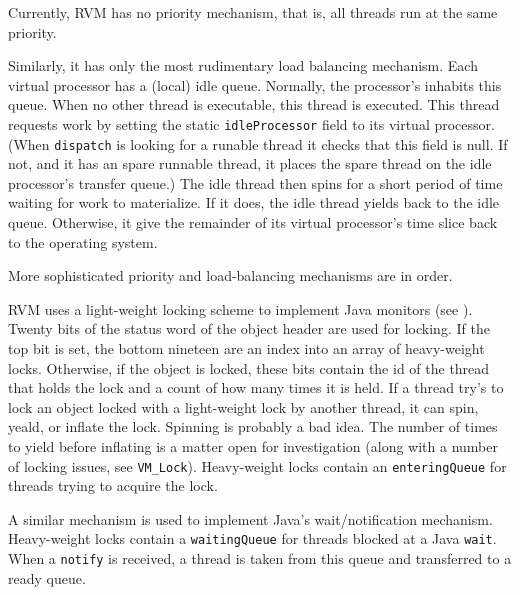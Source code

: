 Currently, RVM has no priority mechanism, that is, all threads run
at the same priority.

Similarly, it has only the most rudimentary load balancing mechanism.
Each virtual processor has a (local) idle queue.  Normally, the
processor's 
inhabits this queue.  When no other
thread is executable, this thread is executed.  This thread requests
work by setting the static {\tt idleProcessor} field to its virtual
processor.  (When {\tt dispatch} is looking for a runable thread it
checks that this field is null.  If not, and it has an spare runnable
thread, it places the spare thread on the idle processor's transfer
queue.)  The idle thread then spins for a short period of time waiting
for work to materialize.  If it does, the idle thread yields back to
the idle queue.  Otherwise, it give the remainder of its virtual
processor's time slice back to the operating system.

More sophisticated priority and load-balancing mechanisms are in
order.

RVM uses a light-weight locking scheme to implement Java monitors (see
).  Twenty bits of the status word of the object header are
used for locking.  If the top bit is set, the bottom nineteen are an
index into an array of heavy-weight locks.  Otherwise, if the object
is locked, these bits contain the id of the thread that holds the lock
and a count of how many times it is held.  If a thread try's to lock
an object locked with a light-weight lock by another thread, it can
spin, yeald, or inflate the lock.  Spinning is probably a bad idea.
The number of times to yield before inflating is a matter open for
investigation (along with a number of locking issues, see {\tt VM\_Lock}).
Heavy-weight locks contain an {\tt enteringQueue} for threads trying
to acquire the lock.

A similar mechanism is used to implement Java's wait/notification
mechanism.  Heavy-weight locks contain a {\tt waitingQueue} for
threads blocked at a Java {\tt wait}.  When a {\tt notify} is
received, a thread is taken from this queue and transferred to a ready
queue.

\JavaTMFooter